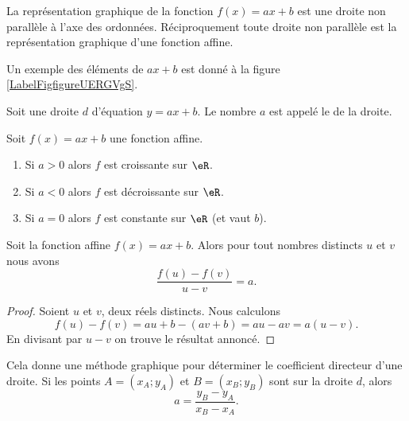 La représentation graphique de la fonction \( f(x)=ax+b\) est une droite non parallèle à l'axe des ordonnées. Réciproquement toute droite non parallèle est la représentation graphique d'une fonction affine.

Un exemple des éléments de \( ax+b\) est donné à la figure \ref{LabelFigfigureUERGVgS}. %
\newcommand{\CaptionFigfigureUERGVgS}{Une droite et quelque éléments de son équation.}


\begin{definition}
    Soit une droite \( d\) d'équation \( y=ax+b\). Le nombre \( a\) est appelé le  de la droite.
\end{definition}

\begin{propriete}
    Soit \( f(x)=ax+b\) une fonction affine.
    \begin{enumerate}
        \item
            Si \( a>0\) alors \( f\) est croissante sur \( \eR\).
        \item
            Si \( a<0\) alors \( f\) est décroissante sur \( \eR\).
        \item
            Si \( a=0\) alors \( f\) est constante sur \( \eR\) (et vaut \( b\)).
    \end{enumerate}
\end{propriete}


\begin{theorem}
    Soit la fonction affine \( f(x)=ax+b\). Alors pour tout nombres distincts \( u\) et \( v\) nous avons
    \begin{equation}
        \frac{ f(u)-f(v) }{ u-v }=a.
    \end{equation}
\end{theorem}

\begin{proof}
    Soient \( u\) et \( v\), deux réels distincts. Nous calculons
    \begin{equation}
        f(u)-f(v)=au+b-(av+b)=au-av=a(u-v).
    \end{equation}
    En divisant par \( u-v\) on trouve le résultat annoncé.
\end{proof}

Cela donne une méthode graphique pour déterminer le coefficient directeur d'une droite. Si les points \( A=(x_A;y_A)\) et \( B=(x_B;y_B)\) sont sur la droite \( d\), alors
\begin{equation}
    a=\frac{ y_B-y_A }{ x_B-x_A }.
\end{equation}

